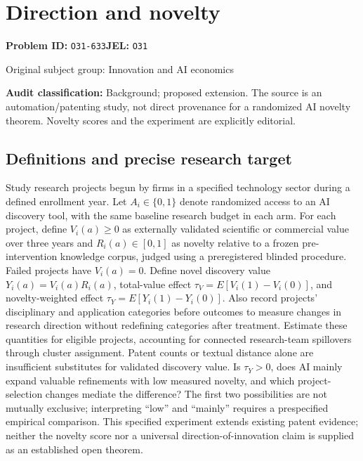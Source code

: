\documentclass[11pt,a4paper]{article}
\begin{document}
\section*{Direction and novelty}
\textbf{Problem ID:} \texttt{O31-633}\quad \textbf{JEL:} \texttt{O31}\par
\label{problem:OP-0419}
{\sffamily\small\color{muted}Original subject group: Innovation and AI economics\par}
\label{definitions:problem:30007701}
\textbf{Audit classification:} Background; proposed extension. The source is an automation/patenting study, not direct provenance for a randomized AI novelty theorem. Novelty scores and the experiment are explicitly editorial.
\subsection*{Definitions and precise research target}
Study research projects begun by firms in a specified technology sector during a defined enrollment year. Let \(A_i\in\{0,1\}\) denote randomized access to an AI discovery tool, with the same baseline research budget in each arm. For each project, define \(V_i(a)\geq0\) as externally validated scientific or commercial value over three years and \(R_i(a)\in[0,1]\) as novelty relative to a frozen pre-intervention knowledge corpus, judged using a preregistered blinded procedure. Failed projects have \(V_i(a)=0\). Define novel discovery value \(Y_i(a)=V_i(a)R_i(a)\), total-value effect \(\tau_V=E[V_i(1)-V_i(0)]\), and novelty-weighted effect \(\tau_Y=E[Y_i(1)-Y_i(0)]\). Also record projects' disciplinary and application categories before outcomes to measure changes in research direction without redefining categories after treatment. Estimate these quantities for eligible projects, accounting for connected research-team spillovers through cluster assignment. Patent counts or textual distance alone are insufficient substitutes for validated discovery value. Is \(\tau_Y>0\), does AI mainly expand valuable refinements with low measured novelty, and which project-selection changes mediate the difference? The first two possibilities are not mutually exclusive; interpreting ``low'' and ``mainly'' requires a prespecified empirical comparison. This specified experiment extends existing patent evidence; neither the novelty score nor a universal direction-of-innovation claim is supplied as an established open theorem.
\end{document}
